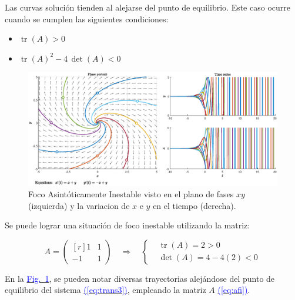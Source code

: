 \documentclass[12pt,a4paper]{report} %
\newcommand{\fref}[1]{\hyperref[#1]{\textcolor{blue}{Fig.~\ref*{#1}}}}
\newcommand{\eref}[1]{\hyperref[#1]{\textcolor{blue}{(\ref*{#1})}}}
\newcommand{\tr}{\operatorname{\textrm{tr}}}
\begin{document}
	\newpage
	
	\vspace{1cm}
	
	\vspace{0.3cm}\noindent Las curvas solución tienden al alejarse del punto de equilibrio. Este caso ocurre cuando se cumplen las siguientes condiciones: 
	\begin{itemize}
		\item $\tr(A)>0$
		\item $\tr(A)^2-4\, \det(A)<0$
	\end{itemize}
	
	\begin{figure}[h]
		\centering
		\includegraphics[width=1\textwidth]{inestable.eps}
		\caption{Foco Asintóticamente Inestable visto en el plano de fases $xy$ (izquierda) y la variacion de $x$ e $y$ en el tiempo (derecha).}
		\label{fig:inestable}
	\end{figure}\smallskip
	
	\vspace{0.3cm}\noindent Se puede lograr una situación de foco inestable utilizando la matriz:
	
	\begin{equation}
		\label{eq:afi}
		A=\begin{pmatrix*}[r]
			1 & 1 \\
			-1 & 1
		\end{pmatrix*} \quad \Longrightarrow \quad 
		\left\{ 
		\begin{aligned}
			&\tr(A)=2>0 \\[2mm]
			&\det(A)=4-4(2)<0
		\end{aligned}
		\right.
	\end{equation}\smallskip
	
	\vspace{0.5cm}\noindent En la \fref{fig:inestable}, se pueden notar diversas trayectorias alejándose del punto de equilibrio del sistema \eref{eq:trans3}, empleando la matriz $A$ \eref{eq:afi}.
	
\end{document}
